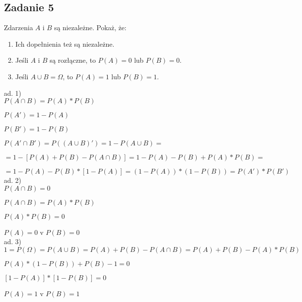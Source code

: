 \subsection{Zadanie 5}

Zdarzenia $A$ i $B$ są niezależne. Pokaż, że:
\begin{enumerate}
\item Ich dopełnienia też są niezależne.
\item Jeśli $A$ i $B$ są rozłączne, to $P(A) = 0$ lub $P(B) = 0$.
\item Jeśli $A \cup B = \Omega$, to $P(A)=1$ lub $P(B)=1$.
\end{enumerate}

ad. 1)\\

$P(A \cap B) = P(A)*P(B)$

$P(A') = 1-P(A)$

$P(B') = 1-P(B)$

$P(A' \cap B') = P((A \cup B)') = 1-P(A \cup B)=$

 $= 1-[P(A)+P(B)-P(A \cap B)] = 1-P(A)-P(B)+P(A)*P(B)=$

$= 1-P(A)-P(B)*[1-P(A)] = (1-P(A))*(1-P(B)) = P(A')*P(B')$\\

ad. 2)\\

$P(A \cap B) = 0$


$P(A \cap B) = P(A)*P(B)$


$P(A)*P(B) = 0$


$P(A) = 0$ v $P(B) = 0$\\

ad. 3)\\

$1=P(\Omega) = P(A \cup B) = P(A)+P(B)-P(A \cap B) = P(A)+P(B)-P(A)*P(B)$

$P(A)*(1-P(B))+P(B)-1=0$

$[1-P(A)]*[1-P(B)] = 0$

$P(A) = 1$ v $P(B) = 1$

